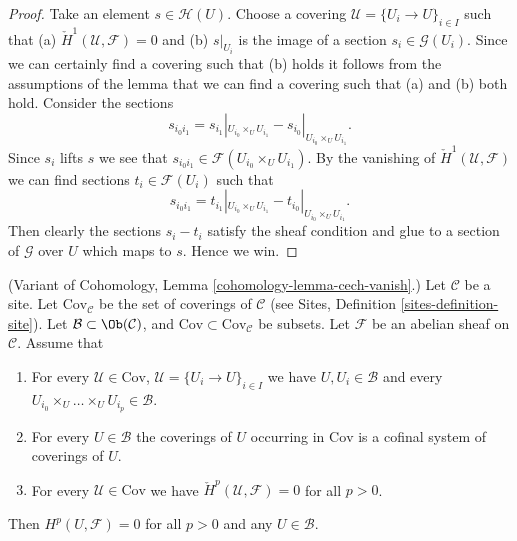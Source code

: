 \begin{proof}
Take an element $s \in \mathcal{H}(U)$. Choose a covering
$\mathcal{U} = \{U_i \to U\}_{i \in I}$ such that
(a) $\check{H}^1(\mathcal{U}, \mathcal{F}) = 0$ and (b)
$s|_{U_i}$ is the image of a section $s_i \in \mathcal{G}(U_i)$.
Since we can certainly find a covering such that (b) holds
it follows from the assumptions of the lemma that we can find
a covering such that (a) and (b) both hold.
Consider the sections
$$
s_{i_0i_1} =
s_{i_1}|_{U_{i_0} \times_U U_{i_1}} - s_{i_0}|_{U_{i_0} \times_U U_{i_1}}.
$$
Since $s_i$ lifts $s$ we see that
$s_{i_0i_1} \in \mathcal{F}(U_{i_0} \times_U U_{i_1})$.
By the vanishing of $\check{H}^1(\mathcal{U}, \mathcal{F})$ we can
find sections $t_i \in \mathcal{F}(U_i)$ such that
$$
s_{i_0i_1} =
t_{i_1}|_{U_{i_0} \times_U U_{i_1}} - t_{i_0}|_{U_{i_0} \times_U U_{i_1}}.
$$
Then clearly the sections $s_i - t_i$ satisfy the sheaf condition
and glue to a section of $\mathcal{G}$ over $U$ which maps to $s$.
Hence we win.
\end{proof}

\begin{lemma}
\label{lemma-cech-vanish-collection}
(Variant of Cohomology, Lemma \ref{cohomology-lemma-cech-vanish}.)
Let $\mathcal{C}$ be a site. Let $\text{Cov}_\mathcal{C}$ be the set
of coverings of $\mathcal{C}$ (see
Sites, Definition \ref{sites-definition-site}). Let
$\mathcal{B} \subset \Ob(\mathcal{C})$, and
$\text{Cov} \subset \text{Cov}_\mathcal{C}$
be subsets. Let $\mathcal{F}$ be an abelian sheaf on $\mathcal{C}$.
Assume that
\begin{enumerate}
\item For every $\mathcal{U} \in \text{Cov}$,
$\mathcal{U} = \{U_i \to U\}_{i \in I}$ we have
$U, U_i \in \mathcal{B}$ and every
$U_{i_0} \times_U \ldots \times_U U_{i_p} \in \mathcal{B}$.
\item For every $U \in \mathcal{B}$ the coverings of $U$
occurring in $\text{Cov}$ is a cofinal system of coverings of $U$.
\item For every $\mathcal{U} \in \text{Cov}$ we have
$\check{H}^p(\mathcal{U}, \mathcal{F}) = 0$ for all $p > 0$.
\end{enumerate}
Then $H^p(U, \mathcal{F}) = 0$ for all $p > 0$ and any $U \in \mathcal{B}$.
\end{lemma}

